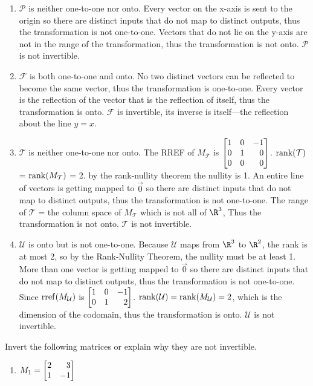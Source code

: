 \begin{exercises}
\begin{problist}
\begin{solution}
\begin{enumerate}
				\item
				$\mathcal P$ is neither one-to-one nor onto.
				Every vector on the x-axis is sent to the origin so there are distinct
				inputs that do not map to distinct outputs,
				thus the transformation is not one-to-one.
				Vectors that do not lie on the y-axis are not in the range of the
				transformation,
				thus the transformation is not onto.
				$\mathcal P$ is not invertible.

				\item
				$\mathcal F$ is both one-to-one and onto.
				No two distinct vectors can be reflected to become the same vector,
				thus the transformation is one-to-one.
				Every vector is the reflection of the vector that is the reflection of
				itself,
				thus the transformation is onto.
				$\mathcal F$ is invertible, its inverse is itself---the reflection about
				the line $y=x$.

				\item
				$\mathcal T$ is neither one-to-one nor onto.
				The RREF of $M_{\mathcal T}$ is $\mat{1&0&-1\\0&1&0\\0&0&0}$.
				$\operatorname{rank}(\mathcal T)$ = $\operatorname{rank}(M_{\mathcal T})$ = 2.
				by the rank-nullity theorem the nullity is 1.
				An entire line of vectors is getting mapped to
				$\vec{0}$ so there are distinct inputs that do not map to distinct
				outputs,
				thus the transformation is not one-to-one.
				The range of $\mathcal T$ = the column space of $M_{\mathcal T}$
				which is not all of $\R^{3}$,
				Thus the transformation is not onto.
				$\mathcal T$ is not invertible.

				\item
				$\mathcal U$ is onto but is not one-to-one.
				Because $\mathcal U$ maps from $\R^{3}$ to $\R^{2}$, the rank is at most
				2, so by the Rank-Nullity Theorem, the nullity must be at least 1. More
				than one vector is getting mapped to $\vec{0}$ so there are distinct
				inputs that do not map to distinct outputs,
				thus the transformation is not one-to-one.
				Since $\operatorname{rref}(M_{\mathcal U})$ is $\mat{1&0&-1\\0&1&2}$.
				$\operatorname{rank}(\mathcal U)=\operatorname{rank}(M_{\mathcal U})=2$, which is
				the dimension of the codomain,
				thus the transformation is onto.
				$\mathcal U$ is not invertible.
			\end{enumerate}
		\end{solution}

		\prob Invert the following matrices or explain why they are not invertible.
		\begin{enumerate}
			\item $M_{1} = \mat{2&3\\1&-1}$


\end{enumerate}
\end{problist}
\end{exercises}
